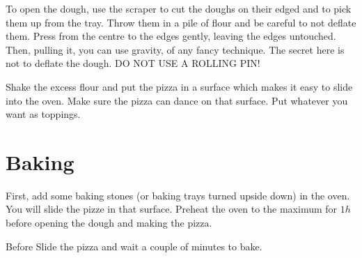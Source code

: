 To open the dough, use the scraper to cut the doughs on their edged and to pick them up from the tray. Throw them in a pile of flour and be careful to not deflate them.
%
Press from the centre to the edges gently, leaving the edges untouched.
%
Then, pulling it, you can use gravity, of any fancy technique. The secret here is not to deflate the dough. DO NOT USE A ROLLING PIN!

Shake the excess flour and put the pizza in a surface which makes it easy to slide into the oven. Make sure the pizza can dance on that surface.
%
Put whatever you want as toppings.


\section{Baking}

First, add some baking stones (or baking trays turned upside down) in the oven. You will slide the pizze in that surface.
%
Preheat the oven to the maximum for $1h$ before opening the dough and making the pizza.

Before 
Slide the pizza and wait a couple of minutes to bake.





